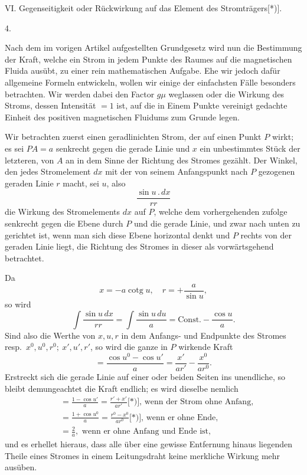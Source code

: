 VI. Gegenseitigkeit oder Rückwirkung auf das Element des Stromträgers[*)].\begingroup\renewcommand{\thefootnote}{}\endgroup

\begin{center}4.\end{center}
\noindent\hspace*{\parindent}Nach dem im vorigen Artikel aufgestellten Grundgesetz wird nun die Bestimmung der Kraft, welche ein Strom in jedem Punkte des Raumes auf die magnetischen Fluida ausübt, zu einer rein mathematischen Aufgabe. Ehe wir jedoch dafür allgemeine Formeln entwickeln, wollen wir einige der einfachsten Fälle besonders betrachten. Wir werden dabei den Factor $g\mu$ weglassen oder die Wirkung des Stroms, dessen Intensität $=1$ ist, auf die in Einem Punkte vereinigt gedachte Einheit des positiven magnetischen Fluidums zum Grunde legen.

Wir betrachten zuerst einen geradlinichten Strom, der auf einen Punkt $P$ wirkt; es sei $PA=a$ senkrecht gegen die gerade Linie und $x$ ein unbestimmtes Stück der letzteren, von $A$ an in dem Sinne der Richtung des Stromes gezählt. Der Winkel, den jedes Stromelement $dx$ mit der von seinem Anfangspunkt nach $P$ gezogenen geraden Linie $r$ macht, sei $u$, also
\[
\frac{\sin u\mathbin{.}dx}{rr}
\]
\noindent die Wirkung des Stromelements $dx$ auf $P$, welche dem vorhergehenden zufolge senkrecht gegen die Ebene durch $P$ und die gerade Linie, und zwar nach unten zu gerichtet ist, wenn man sich diese Ebene horizontal denkt und $P$ rechts von der geraden Linie liegt, die Richtung des Stromes in dieser als vorwärtsgehend betrachtet.

\clearpage{}
Da
\[
x=-a\operatorname{cotg}u,\quad r=+\frac{a}{\sin u},
\]
\noindent so wird
\[
\int\frac{\sin u\,dx}{rr}=\int\frac{\sin u\,du}{a}=\text{Const.}-\frac{\cos u}{a}.
\]
\noindent Sind also die Werthe von $x,u,r$ in dem Anfangs- und Endpunkte des Stromes resp.\ $x^0,u^0,r^0;\ x',u',r'$, so wird die ganze in $P$ wirkende Kraft
\[
=\frac{\cos u^0-\cos u'}{a}=\frac{x'}{ar'}-\frac{x^0}{ar^0}.
\]
\noindent Erstreckt sich die gerade Linie auf einer oder beiden Seiten ins unendliche, so bleibt demungeachtet die Kraft endlich; es wird dieselbe nemlich
\[
\begin{aligned}
&=\frac{1-\cos u'}{a}=\frac{r'+x'}{ar'}\text{[*)], wenn der Strom ohne Anfang,}\\[5pt]
&=\frac{1+\cos u^0}{a}=\frac{r^0-x^0}{ar^0}\text{[*)], wenn er ohne Ende,}\\[5pt]
&=\frac{2}{a},\text{ wenn er ohne Anfang und Ende ist,}
\end{aligned}
\]
\begingroup\renewcommand{\thefootnote}{}\endgroup
\noindent und es erhellet hieraus, dass alle über eine gewisse Entfernung hinaus liegenden Theile eines Stromes in einem Leitungsdraht keine merkliche Wirkung mehr ausüben.
\clearpage\endgroup
